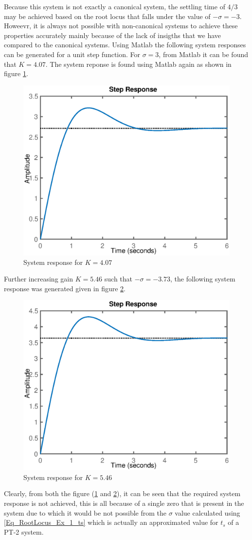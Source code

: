 Because this system is not exactly a canonical system, the settling time of $4/3$ may be achieved based on the root locus that falls under the value of $-\sigma = -3$. Howeevr, it is always not possible with non-canonical systems to achieve these properties accurately mainly because of the lack of insigths that we have compared to the canonical systems. Using Matlab the following system responses can be generated for a unit step function. For $\sigma = 3$, from Matlab it can be found that $K = 4.07$. The system reponse is found using Matlab again as shown in figure \ref{Fig_RootLocus_Ex_1_sysRes_1}.
\begin{figure}[h!]
	\centering
	\includegraphics[width=0.7\linewidth]{Bilder/RootLocus_Ex_1_Res_1.eps}
	\caption{System response for $K = 4.07$}
	\label{Fig_RootLocus_Ex_1_sysRes_1}
\end{figure}
\newpage
Further increasing gain $K = 5.46$ such that $-\sigma = -3.73$, the following system response was generated given in figure \ref{Fig_RootLocus_Ex_1_sysRes_2}.
\begin{figure}[h!]
	\centering
	\includegraphics[width=0.7\linewidth]{Bilder/RootLocus_Ex_1_Res_2.eps}
	\caption{System response for $K = 5.46$}
	\label{Fig_RootLocus_Ex_1_sysRes_2}
\end{figure}
\newpage
Clearly, from both the figure (\ref{Fig_RootLocus_Ex_1_sysRes_1} and \ref{Fig_RootLocus_Ex_1_sysRes_2}), it can be seen that the required system response is not achieved, this is all because of a single zero that is present in the system due to which it would be not possible from the $\sigma$ value calculated using \eqref{Eq_RootLocus_Ex_1_ts} which is actually an approximated value for $t_s$ of a PT-2 system.

